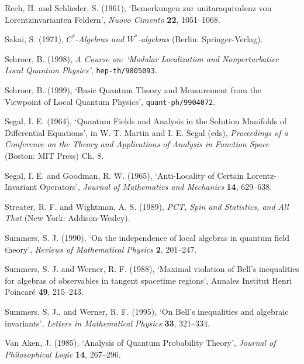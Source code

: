 \documentclass[12pt]{article}
\begin{document}
  \noindent Reeh, H. and Schlieder, S. (1961), `Bemerkungen zur 
  unitaraquivalenz von Lorentzinvarianten Feldern', \emph{Nuovo 
  Cimento} \textbf{22}, 1051--1068.\vspace{.1in}
  
\noindent Sakai, S. (1971), \emph{$C^{*}$-Algebras and $W^{*}$-algebras} 
(Berlin: Springer-Verlag).\vspace{.1in}

\noindent Schroer, B. (1998), \emph{A Course on: `Modular Localization and 
Nonperturbative Local Quantum Physics'}, {\tt hep-th/9805093}.\vspace{.1in}

\noindent Schroer, B. (1999), `Basic Quantum Theory and Measurement 
from the Viewpoint of Local Quantum Physics', {\tt quant-ph/9904072}.\vspace{.1in}

\noindent Segal, I. E. (1964), `Quantum Fields and Analysis in the 
Solution Manifolds of Differential Equations', in W. T. Martin and I. 
E. Segal (eds), \emph{Proceedings of a Conference on the Theory and 
Applications of Analysis in Function Space} (Boston: MIT Press) Ch. 8.\vspace{.1in}

\noindent Segal, I. E. and Goodman, R. W. (1965), `Anti-Locality 
of Certain Lorentz-Invariant Operators', \emph{Journal of Mathematics and 
Mechanics} \textbf{14}, 
629--638. \vspace{.1in}

\noindent Streater, R. F. and Wightman, A. S. (1989), 
\emph{PCT, Spin and Statistics, and All That} (New York: Addison-Wesley).\vspace{.1in}

\noindent Summers, S. J. (1990), `On the independence of local
  algebras in quantum field theory', \emph{Reviews of Mathematical 
  Physics} \textbf{2}, 201--247.\vspace{.1in}

\noindent Summers, S. J. and Werner, R. F. (1988), `Maximal violation of
Bell's inequalities for algebras of observables in tangent spacetime
regions',  Annales Institut Henri Poincar{\'e} \textbf{49}, 215--243.

\noindent Summers, S. J., and Werner, R. F. (1995), `On Bell's
inequalities and algebraic invariants', \emph{Letters in Mathematical 
Physics} \textbf{33},
321--334.\vspace{.1in}

\noindent Van Aken, J. 
(1985), 
`Analysis of Quantum Probability Theory', \emph{Journal of 
Philosophical Logic} 
\textbf{14}, 267--296.\vspace{.1in}
\end{document}
